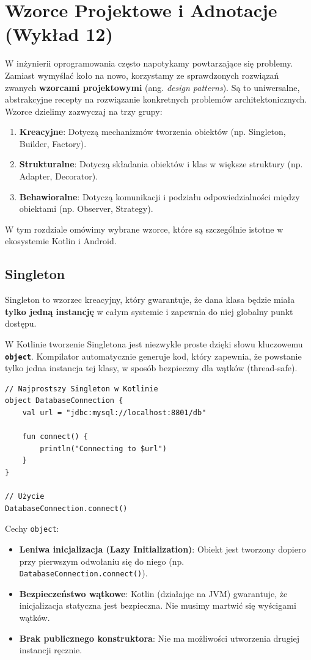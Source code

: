 \chapter{Wzorce Projektowe i Adnotacje (Wykład 12)}

W inżynierii oprogramowania często napotykamy powtarzające się problemy. Zamiast wymyślać koło na nowo, korzystamy ze sprawdzonych rozwiązań zwanych \textbf{wzorcami projektowymi} (ang. \textit{design patterns}). Są to uniwersalne, abstrakcyjne recepty na rozwiązanie konkretnych problemów architektonicznych. Wzorce dzielimy zazwyczaj na trzy grupy:
\begin{enumerate}
    \item \textbf{Kreacyjne}: Dotyczą mechanizmów tworzenia obiektów (np. Singleton, Builder, Factory).
    \item \textbf{Strukturalne}: Dotyczą składania obiektów i klas w większe struktury (np. Adapter, Decorator).
    \item \textbf{Behawioralne}: Dotyczą komunikacji i podziału odpowiedzialności między obiektami (np. Observer, Strategy).
\end{enumerate}

W tym rozdziale omówimy wybrane wzorce, które są szczególnie istotne w ekosystemie Kotlin i Android.

\section{Singleton}

Singleton to wzorzec kreacyjny, który gwarantuje, że dana klasa będzie miała \textbf{tylko jedną instancję} w całym systemie i zapewnia do niej globalny punkt dostępu.

W Kotlinie tworzenie Singletona jest niezwykle proste dzięki słowu kluczowemu \textbf{\texttt{object}}. Kompilator automatycznie generuje kod, który zapewnia, że powstanie tylko jedna instancja tej klasy, w sposób bezpieczny dla wątków (thread-safe).

\begin{verbatim}
// Najprostszy Singleton w Kotlinie
object DatabaseConnection {
    val url = "jdbc:mysql://localhost:8801/db"
    
    fun connect() {
        println("Connecting to $url")
    }
}

// Użycie
DatabaseConnection.connect()
\end{verbatim}

Cechy \texttt{object}:
\begin{itemize}
    \item \textbf{Leniwa inicjalizacja (Lazy Initialization)}: Obiekt jest tworzony dopiero przy pierwszym odwołaniu się do niego (np. \texttt{DatabaseConnection.connect()}).
    \item \textbf{Bezpieczeństwo wątkowe}: Kotlin (działając na JVM) gwarantuje, że inicjalizacja statyczna jest bezpieczna. Nie musimy martwić się wyścigami wątków.
    \item \textbf{Brak publicznego konstruktora}: Nie ma możliwości utworzenia drugiej instancji ręcznie.
\end{itemize}

